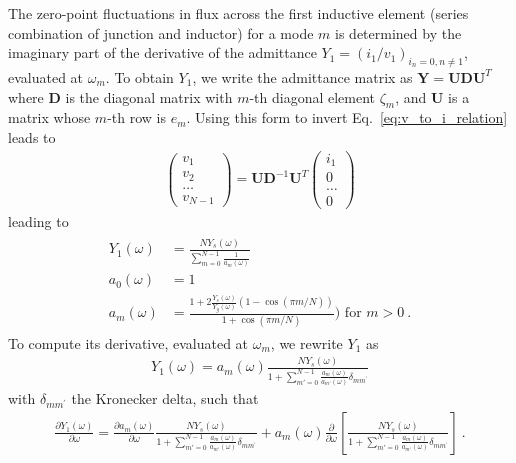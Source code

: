 The zero-point fluctuations in flux across the first inductive element (series combination of junction and inductor) for a mode $m$ is determined by the imaginary part of the derivative of the admittance $Y_1 = \left(i_1/v_1\right)_{i_n = 0, n\ne 1}$, evaluated at $\omega_m$.
%
To obtain $Y_1$, we write the admittance matrix as $\mathbf{Y} = \mathbf{U} \mathbf{D} \mathbf{U}^{T} $ where $  \mathbf{D} $ is the diagonal matrix with  $m$-th diagonal element $\zeta_m$,  and $ \mathbf{U}$ is a matrix whose $m$-th row is $e_m$.
%
Using this form to invert Eq.~\eqref{eq:v_to_i_relation} leads to
\begin{align}
%
\left(
\begin{array}{c}
v_{1} \\
v_{2} \\
\dots \\
v_{N-1}
\end{array}
\right)
=
\mathbf{U} \mathbf{D}^{-1} \mathbf{U}^{T}
\left(
\begin{array}{c}
i_1   \\
0     \\
\dots \\
0
\end{array}
\right)
\end{align}
leading to
\begin{align}
\begin{split}
Y_{1}(\omega)&=  \frac{N Y_s (\omega)}{\sum_{m=0}^{N-1}\frac{1}{a_m(\omega)}}\\
a_0(\omega) &= 1\\
a_{m}(\omega) &= \frac{1+2\frac{Y_s(\omega)}{Y_g(\omega)}(1 - \cos (\pi m/ N))}{ 1 + \cos (\pi m/ N) })\text{ for }m>0\ .
\end{split}
\end{align}
To compute its derivative, evaluated at $\omega_m$, we rewrite $Y_1$ as
\begin{align}
Y_{1}(\omega)=  a_m(\omega)\frac{N Y_s(\omega) }{1+\sum_{m'=0}^{N-1}\frac{a_m(\omega)}{a_{m'}(\omega)}\delta_{mm^\prime}}
\end{align}
with $\delta_{mm^\prime}$ the Kronecker delta, such that
\begin{align}
\frac{\partial Y_{1}(\omega)}{\partial\omega}=  \frac{\partial a_m(\omega)}{\partial\omega}\frac{N Y_s(\omega) }{1+\sum_{m'=0}^{N-1}\frac{a_m(\omega)}{a_{m'}(\omega)}\delta_{mm^\prime}}+ a_m(\omega)\frac{\partial }{\partial\omega}\left[\frac{N Y_s(\omega) }{1+\sum_{m'=0}^{N-1}\frac{a_m(\omega)}{a_{m'}(\omega)}\delta_{mm^\prime}}\right]\ .
\end{align}
